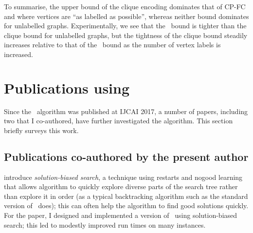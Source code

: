 To summarise, the upper bound of the clique encoding
dominates that of CP-FC and \McSplit where vertices are ``as labelled as possible'',
whereas neither bound dominates for unlabelled graphs.  Experimentally, we
see that the \McSplit\ bound is tighter than the clique bound for unlabelled
graphs, but the tightness of the clique bound steadily increases
relative to that of the \McSplit\ bound as the number of vertex
labels is increased.


\section{Publications using \McSplit}\label{sec:mcsplit-papers}

Since the \McSplit\ algorithm was published at IJCAI 2017, a number of papers, including
two that I co-authored, have further investigated the algorithm.
This section briefly surveys this work.

\subsection{Publications co-authored by the present author}

\citet{DBLP:conf/cpaior/ArchibaldDHMP019} introduce \emph{solution-biased search},
a technique using restarts and nogood learning that allows algorithm to quickly explore diverse
parts of the search tree rather than explore it in order (as a typical backtracking algorithm
such as the standard version of \McSplit\ does); this can often help the algorithm to find good
solutions quickly.  For the paper, I designed and implemented a version
of \McSplit\ using solution-biased search; this led to modestly improved run times on many instances.

